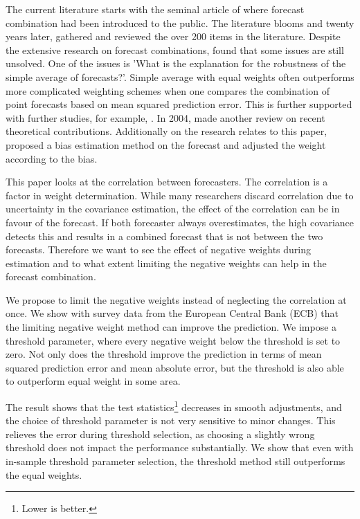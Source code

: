 \documentclass[11pt]{article}
\let\rmarkdownfootnote\footnote%
\def\footnote{\protect\rmarkdownfootnote}
\begin{document}
The current literature starts with the seminal article of \cite{Bates1969} where forecast combination had been introduced to the public. The literature blooms and twenty years later, \cite{Clemen1989} gathered and reviewed the over 200 items in the literature. Despite the extensive research on forecast combinations, \citeauthor{Clemen1989} found that some issues are still unsolved. One of the issues is 'What is the explanation for the robustness of the simple average of forecasts?'. Simple average with equal weights often outperforms more complicated weighting schemes when one compares the combination of point forecasts based on mean squared prediction error. This is further supported with further studies, for example, \citep{Stock2004}. In 2004, \citeauthor{Elliot2004} made another review on recent theoretical contributions. Additionally on the research relates to this paper, \cite{Gibbs2017} proposed a bias estimation method on the forecast and adjusted the weight according to the bias.

This paper looks at the correlation between forecasters. The correlation is a factor in weight determination. While many researchers discard correlation due to uncertainty in the covariance estimation, the effect of the correlation can be in favour of the forecast. If both forecaster always overestimates, the high covariance detects this and results in a combined forecast that is not between the two forecasts. Therefore we want to see the effect of negative weights during estimation and to what extent limiting the negative weights can help in the forecast combination.

We propose to limit the negative weights instead of neglecting the correlation at once. We show with survey data from the European Central Bank (ECB) that the limiting negative weight method can improve the prediction. We impose a threshold parameter, where every negative weight below the threshold is set to zero. Not only does the threshold improve the prediction in terms of mean squared prediction error and mean absolute error, but the threshold is also able to outperform equal weight in some area.

The result shows that the test statistics\footnote{Lower is better.} decreases in smooth adjustments, and the choice of threshold parameter is not very sensitive to minor changes. This relieves the error during threshold selection, as choosing a slightly wrong threshold does not impact the performance substantially. We show that even with in-sample threshold parameter selection, the threshold method still outperforms the equal weights.
\end{document}
